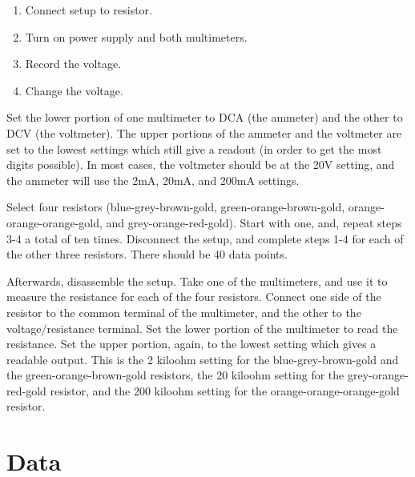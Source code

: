 \documentclass[11pt]{article}
\begin{document}
\begin{enumerate}
    \item Connect setup to resistor.
    \item Turn on power supply and both multimeters.
    \item Record the voltage. 
    \item Change the voltage. 
\end{enumerate}

Set the lower portion of one multimeter to DCA (the ammeter) and the other to DCV (the voltmeter). The upper portions of the ammeter and the voltmeter are set to the lowest settings which still give a readout (in order to get the most digits possible). In most cases, the voltmeter should be at the 20V setting, and the ammeter will use the 2mA, 20mA, and 200mA settings.

Select four resistors (blue-grey-brown-gold, green-orange-brown-gold, orange-orange-orange-gold, and grey-orange-red-gold). Start with one, and, repeat steps 3-4 a total of ten times. Disconnect the setup, and complete steps 1-4 for each of the other three resistors. There should be 40 data points. 

Afterwards, disassemble the setup. Take one of the multimeters, and use it to measure the resistance for each of the four resistors. Connect one side of the resistor to the common terminal of the multimeter, and the other to the voltage/resistance terminal. Set the lower portion of the multimeter to read the resistance. Set the upper portion, again, to the lowest setting which gives a readable output. This is the 2 kiloohm setting for the blue-grey-brown-gold and the green-orange-brown-gold resistors, the 20 kiloohm setting for the grey-orange-red-gold resistor, and the 200 kiloohm setting for the orange-orange-orange-gold resistor.

\section{Data}
\end{document}
